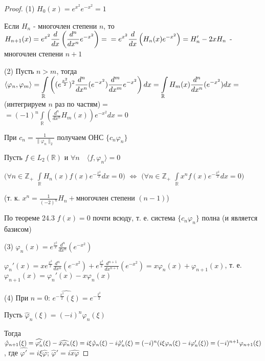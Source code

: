\documentclass[a4paper,12pt]{report}
\newcommand*{\hm}[1]{#1\nobreak\discretionary{}%
            {\hbox{$\mathsurround=0pt #1$}}{}}
\begin{document}
\begin{proof}
(1) $H_0(x)=e^{x^2}e^{-x^2}=1$

Если $H_n$ - многочлен степени $n$, то $H_{n+1}(x)=e^{x^2}\displaystyle\frac{d}{dx}\left(\displaystyle\frac{d^n}{dx^n}e^{-x^2}\right)=\\=e^{x^2}\displaystyle\frac{d}{dx}\left(H_n(x)e^{-x^2}\right)=H_n'-2xH_n$ - многочлен степени $n+1$

(2) Пусть $n>m$, тогда $\langle\varphi_n,\varphi_m\rangle=\displaystyle\int\limits_{\mathbb R}\left((e^{\frac{x^2}{2}})^2\frac{d^n}{dx^n}(e^{-x^2})\frac{d^m}{dx^m}e^{-x^2}\right)dx\hm=\displaystyle\int\limits_{\mathbb R}H_m(x)\frac{d^n}{dx^n}(e^{-x^2})dx=$(интегрируем $n$ раз по частям)$=$\\$=(-1)^n\displaystyle\int\limits_{\mathbb R}\left(\frac{d^n}{dx^n}H_m(x)\right)e^{-x^2}dx=0$

При $c_n=\displaystyle\frac1{\|\varphi_n\|_2}$ получаем ОНС $\{c_n\varphi_n\}$

Пусть $f\in L_2(\mathbb R)$ и $\forall n\quad\langle f,\varphi_n\rangle=0$

 $\bigl(\forall n\in\mathbb Z_+$ $\displaystyle\int\limits_{\mathbb R}H_n(x)f(x)e^{-\frac{x^2}{2}}dx=0\bigr)$ $\Longleftrightarrow$ $\bigl(\forall n\in\mathbb Z_+$ $\displaystyle\int\limits_{\mathbb R}x^nf(x)e^{-\frac{x^2}{2}}dx=0\bigr)$

(т. к. $x^n=\displaystyle\frac1{(-2)^n}H_n+$многочлен степени $(n-1)$)

По теореме 24.3 $f(x)=0$ почти всюду, т. е. система $\{c_n\varphi_n\}$ полна (и является базисом)

(3) $\varphi_n(x)=e^{\frac{x^2}{2}}\displaystyle\frac{d^n}{dx^n}(e^{-x^2})$

$\varphi_n'(x)=xe^{\frac{x^2}{2}}\displaystyle\frac{d^n}{dx^n}(e^{-x^2})+e^{\frac{x^2}{2}}\displaystyle\frac{d^{n+1}}{dx^{n+1}}(e^{-x^2})=x\varphi_n(x)+\varphi_{n+1}(x)$, т. е. \\$\varphi_{n+1}(x)=\varphi_n'(x)-x\varphi_n(x)$

(4) При $n=0$: $\widehat{e^{-\frac{x^2}{2}}(\xi)}=e^{-\frac{\xi^2}{2}}$

Пусть $\hat\varphi_n(\xi)=(-i)^n\varphi_n(\xi)$

Тогда $\hat\varphi_{n+1}(\xi)=\widehat{\varphi_n'}(\xi)-\widehat{x\varphi_n}(\xi)=i\xi\hat\varphi_n(\xi)-i\hat\varphi_n'(\xi)=(-i)^n(i\xi\varphi_n(\xi)\hm-i\varphi_n'(\xi))=(-i)^{n+1}\varphi_{n+1}(\xi)$, где $\widehat{\varphi'}=i\xi\hat\varphi$; $\hat\varphi'=i\widehat{x\varphi}$
\end{proof}
\end{document}
